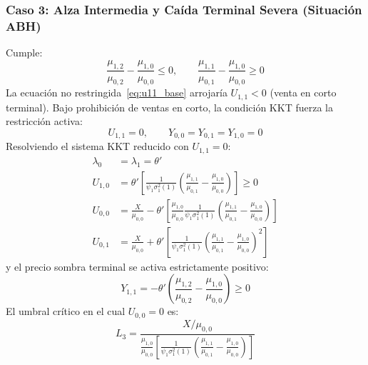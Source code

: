 \documentclass[11pt,a4paper]{report}
\numberwithin{equation}{chapter}
\begin{document}
\subsubsection{Caso 3: Alza Intermedia y Caída Terminal Severa (Situación ABH)}
Cumple:
\begin{equation}
    \frac{\mu_{1,2}}{\mu_{0,2}} - \frac{\mu_{1,0}}{\mu_{0,0}} \le 0, \qquad \frac{\mu_{1,1}}{\mu_{0,1}} - \frac{\mu_{1,0}}{\mu_{0,0}} \ge 0
\end{equation}
La ecuación no restringida~\eqref{eq:u11_base} arrojaría $U_{1,1} < 0$ (venta en corto terminal). Bajo prohibición de ventas en corto, la condición KKT fuerza la restricción activa:
\begin{equation}
    U_{1,1} = 0, \qquad Y_{0,0} = Y_{0,1} = Y_{1,0} = 0
\end{equation}
Resolviendo el sistema KKT reducido con $U_{1,1} = 0$:
\begin{align}
    \lambda_0 &= \lambda_1 = \theta' \\
    U_{1,0} &= \theta' \left[ \frac{1}{\psi_1 \sigma_1^2(1)} \left( \frac{\mu_{1,1}}{\mu_{0,1}} - \frac{\mu_{1,0}}{\mu_{0,0}} \right) \right] \ge 0 \\
    U_{0,0} &= \frac{X}{\mu_{0,0}} - \theta' \left[ \frac{\mu_{1,0}}{\mu_{0,0}} \frac{1}{\psi_1 \sigma_1^2(1)} \left( \frac{\mu_{1,1}}{\mu_{0,1}} - \frac{\mu_{1,0}}{\mu_{0,0}} \right) \right] \\
    U_{0,1} &= \frac{X}{\mu_{0,0}} + \theta' \left[ \frac{1}{\psi_1 \sigma_1^2(1)} \left( \frac{\mu_{1,1}}{\mu_{0,1}} - \frac{\mu_{1,0}}{\mu_{0,0}} \right)^2 \right]
\end{align}
y el precio sombra terminal se activa estrictamente positivo:
\begin{equation}
    \boxed{Y_{1,1} = -\theta' \left( \frac{\mu_{1,2}}{\mu_{0,2}} - \frac{\mu_{1,0}}{\mu_{0,0}} \right) \ge 0}
\end{equation}
El umbral crítico en el cual $U_{0,0} = 0$ es:
\begin{equation}
    \boxed{L_3 = \frac{X / \mu_{0,0}}{\frac{\mu_{1,0}}{\mu_{0,0}} \left[ \frac{1}{\psi_1 \sigma_1^2(1)}\left( \frac{\mu_{1,1}}{\mu_{0,1}} - \frac{\mu_{1,0}}{\mu_{0,0}} \right) \right]}}
\end{equation}
\end{document}
